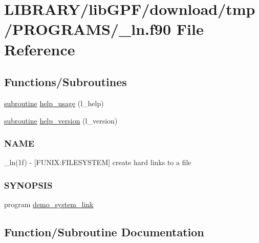 \hypertarget{__ln_8f90}{}\section{L\+I\+B\+R\+A\+R\+Y/lib\+G\+P\+F/download/tmp/\+P\+R\+O\+G\+R\+A\+M\+S/\+\_\+ln.f90 File Reference}
\label{__ln_8f90}
\subsection*{Functions/\+Subroutines}
\begin{DoxyCompactItemize}
\item 
\hyperlink{M__stopwatch_83_8txt_acfbcff50169d691ff02d4a123ed70482}{subroutine} \hyperlink{__ln_8f90_a3e09a3b52ee8fb04eeb93fe5761626a8}{help\+\_\+usage} (l\+\_\+help)
\item 
\hyperlink{M__stopwatch_83_8txt_acfbcff50169d691ff02d4a123ed70482}{subroutine} \hyperlink{__ln_8f90_a39c21619b08a3c22f19e2306efd7f766}{help\+\_\+version} (l\+\_\+version)
\begin{DoxyCompactList}\small\item\em \subsubsection*{N\+A\+ME}

\+\_\+ln(1f) -\/ \mbox{[}F\+U\+N\+IX\+:F\+I\+L\+E\+S\+Y\+S\+T\+EM\mbox{]} create hard links to a file \subsubsection*{S\+Y\+N\+O\+P\+S\+IS}\end{DoxyCompactList}\item 
program \hyperlink{__ln_8f90_a1b05022af7f0b5c0f963a252a5ef2ce7}{demo\+\_\+system\+\_\+link}
\end{DoxyCompactItemize}


\subsection{Function/\+Subroutine Documentation}
\mbox{\label{__ln_8f90_a1b05022af7f0b5c0f963a252a5ef2ce7}} 
